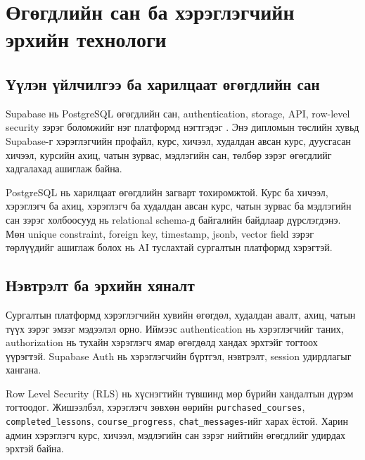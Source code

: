 \section{Өгөгдлийн сан ба хэрэглэгчийн эрхийн технологи}
\subsection{Үүлэн үйлчилгээ ба харилцаат өгөгдлийн сан}
Supabase нь PostgreSQL өгөгдлийн сан, authentication, storage, API, row-level security зэрэг боломжийг нэг платформд нэгтгэдэг \cite{supabase_docs}. Энэ дипломын төслийн хувьд Supabase-г хэрэглэгчийн профайл, курс, хичээл, худалдан авсан курс, дуусгасан хичээл, курсийн ахиц, чатын зурвас, мэдлэгийн сан, төлбөр зэрэг өгөгдлийг хадгалахад ашиглаж байна.

PostgreSQL нь харилцаат өгөгдлийн загварт тохиромжтой. Курс ба хичээл, хэрэглэгч ба ахиц, хэрэглэгч ба худалдан авсан курс, чатын зурвас ба мэдлэгийн сан зэрэг холбоосууд нь relational schema-д байгалийн байдлаар дүрслэгдэнэ. Мөн unique constraint, foreign key, timestamp, jsonb, vector field зэрэг төрлүүдийг ашиглаж болох нь AI туслахтай сургалтын платформд хэрэгтэй.

\subsection{Нэвтрэлт ба эрхийн хяналт}
Сургалтын платформд хэрэглэгчийн хувийн өгөгдөл, худалдан авалт, ахиц, чатын түүх зэрэг эмзэг мэдээлэл орно. Иймээс authentication нь хэрэглэгчийг таних, authorization нь тухайн хэрэглэгч ямар өгөгдөлд хандах эрхтэйг тогтоох үүрэгтэй. Supabase Auth нь хэрэглэгчийн бүртгэл, нэвтрэлт, session удирдлагыг хангана.

Row Level Security (RLS) нь хүснэгтийн түвшинд мөр бүрийн хандалтын дүрэм тогтоодог. Жишээлбэл, хэрэглэгч зөвхөн өөрийн \texttt{purchased\_courses}, \texttt{completed\_lessons}, \texttt{course\_progress}, \texttt{chat\_messages}-ийг харах ёстой. Харин админ хэрэглэгч курс, хичээл, мэдлэгийн сан зэрэг нийтийн өгөгдлийг удирдах эрхтэй байна.


